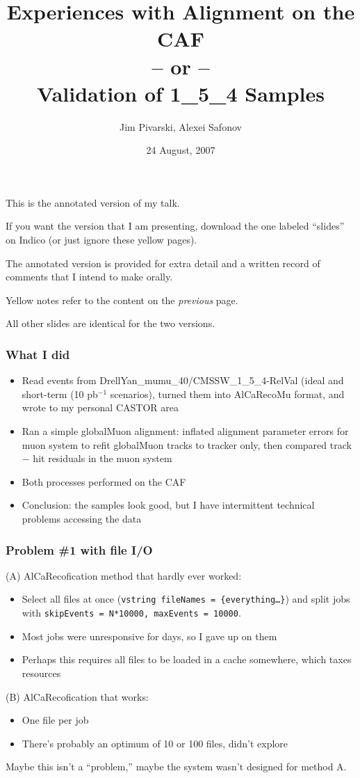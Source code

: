 \documentclass[compress]{beamer}
\title{Experiences with Alignment on the CAF \\ -- or -- \\ Validation of 1\_5\_4 Samples}
\author{Jim Pivarski, Alexei Safonov}
\institute{Texas A\&M University}
\date{24 August, 2007}
\begin{document}
\frame{\titlepage}

\begin{notes}
\item This is the annotated version of my talk.
\item If you want the version that I am presenting, download the one
labeled ``slides'' on Indico (or just ignore these yellow pages).
\item The annotated version is provided for extra detail and a written
record of comments that I intend to make orally.
\item Yellow notes refer to the content on the {\it previous} page.
\item All other slides are identical for the two versions.
\end{notes}

\begin{frame}
\frametitle{What I did}
\begin{itemize}\setlength{\itemsep}{0.5 cm}
\item Read events from DrellYan\_mumu\_40/CMSSW\_1\_5\_4-RelVal (ideal
and short-term (10 pb$^{-1}$ scenarios), turned them into AlCaRecoMu
format, and wrote to my personal CASTOR area

\item Ran a simple globalMuon alignment: inflated alignment parameter
errors for muon system to refit globalMuon tracks to tracker only,
then compared track $-$ hit residuals in the muon system

\item Both processes performed on the CAF

\item Conclusion: the samples look good, but I have intermittent
technical problems accessing the data
\end{itemize}
\end{frame}

\begin{frame}
\frametitle{Problem \#1 with file I/O}

(A) AlCaRecofication method that hardly ever worked:
\begin{itemize}
\item Select all files at once ({\tt vstring fileNames =
\{everything\ldots\}}) and split jobs with {\tt skipEvents = N*10000,
maxEvents = 10000}.

\item Most jobs were unresponsive for days, so I gave up on them

\item Perhaps this requires all files to be loaded in a cache
somewhere, which taxes resources
\end{itemize}

\vfill
(B) AlCaRecofication that works:
\begin{itemize}
\item One file per job

\item There's probably an optimum of 10 or 100 files, didn't explore
\end{itemize}

\vfill
Maybe this isn't a ``problem,'' maybe the system wasn't designed for method A.
\end{frame}
\end{document}
